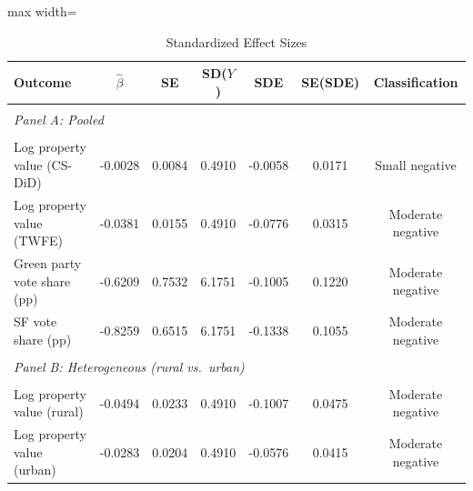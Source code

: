 \begin{table}[!ht]
\centering
\caption{Standardized Effect Sizes}
\label{tab:sde}
\begin{adjustbox}{max width=\textwidth}
\begin{tabular}{lcccccc}
\hline\hline
Outcome & $\hat{\beta}$ & SE & SD($Y$) & SDE & SE(SDE) & Classification \\
\hline
\\[-1.2ex]
\multicolumn{7}{l}{\textit{Panel A: Pooled}} \\
\\[-1.2ex]
Log property value (CS-DiD) & -0.0028 & 0.0084 & 0.4910 & -0.0058 & 0.0171 & Small negative \\
Log property value (TWFE) & -0.0381 & 0.0155 & 0.4910 & -0.0776 & 0.0315 & Moderate negative \\
Green party vote share (pp) & -0.6209 & 0.7532 & 6.1751 & -0.1005 & 0.1220 & Moderate negative \\
SF vote share (pp) & -0.8259 & 0.6515 & 6.1751 & -0.1338 & 0.1055 & Moderate negative \\
\\[-1.2ex]
\multicolumn{7}{l}{\textit{Panel B: Heterogeneous (rural vs.\ urban)}} \\
\\[-1.2ex]
Log property value (rural) & -0.0494 & 0.0233 & 0.4910 & -0.1007 & 0.0475 & Moderate negative \\
Log property value (urban) & -0.0283 & 0.0204 & 0.4910 & -0.0576 & 0.0415 & Moderate negative \\
\hline\hline
\end{tabular}
\end{adjustbox}
\begin{tablenotes}[flushleft]\small

\end{tablenotes}
\end{table}
